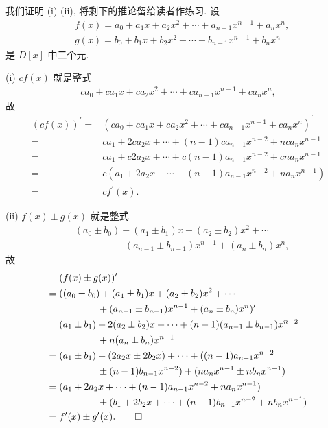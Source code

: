 \begin{pf}
    我们证明 (i) (ii), 将剩下的推论留给读者作练习. 设
    \begin{align*}
         & f(x) = a_0 + a_1 x + a_2 x^2 + \cdots + a_{n-1} x^{n-1} + a_n x^n, \\
         & g(x) = b_0 + b_1 x + b_2 x^2 + \cdots + b_{n-1} x^{n-1} + b_n x^n
    \end{align*}
    是 $D[x]$ 中二个元.

    (i) $cf(x)$ 就是整式
    \begin{align*}
        ca_0 + ca_1 x + ca_2 x^2 + \cdots + ca_{n-1} x^{n-1} + ca_n x^n,
    \end{align*}
    故
    \begin{align*}
        (cf(x))^{\prime}
        = {} & (ca_0 + ca_1 x + ca_2 x^2 + \cdots + ca_{n-1} x^{n-1} + ca_n x^n)^{\prime} \\
        = {} & ca_1 + 2ca_2 x + \cdots + (n-1)ca_{n-1} x^{n-2} + nca_n x^{n-1}            \\
        = {} & ca_1 + c2a_2 x + \cdots + c(n-1)a_{n-1} x^{n-2} + cna_n x^{n-1}            \\
        = {} & c(a_1 + 2a_2 x + \cdots + (n-1)a_{n-1} x^{n-2} + na_n x^{n-1})             \\
        = {} & cf^{\prime} (x).
    \end{align*}

    (ii) $f(x) \pm g(x)$ 就是整式
    \begin{align*}
         & (a_0 \pm b_0) + (a_1 \pm b_1) x + (a_2 \pm b_2) x^2 + \cdots       \\
         & \qquad \qquad + (a_{n-1} \pm b_{n-1}) x^{n-1} + (a_n \pm b_n) x^n,
    \end{align*}
    故
    \begin{align*}
             & (f(x) \pm g(x))^{\prime}                                                        \\
        = {} & ((a_0 \pm b_0) + (a_1 \pm b_1) x + (a_2 \pm b_2) x^2 + \cdots                   \\
             & \qquad \qquad + (a_{n-1} \pm b_{n-1}) x^{n-1} + (a_n \pm b_n) x^n)^{\prime}     \\
        = {} & (a_1 \pm b_1) + 2(a_2 \pm b_2) x + \cdots + (n-1) (a_{n-1} \pm b_{n-1}) x^{n-2} \\
             & \qquad \qquad + n (a_n \pm b_n) x^{n-1}                                         \\
        = {} & (a_1 \pm b_1) + (2a_2 x \pm 2b_2 x) + \cdots + ((n-1)a_{n-1} x^{n-2}            \\
             & \qquad \qquad \pm (n-1)b_{n-1} x^{n-2})
        + (na_n x^{n-1} \pm nb_n x^{n-1})                                                      \\
        = {} & (a_1 + 2a_2 x + \cdots + (n-1)a_{n-1} x^{n-2} + na_n x^{n-1})                   \\
             & \qquad \qquad \pm (b_1 + 2b_2 x + \cdots + (n-1)b_{n-1} x^{n-2} + nb_n x^{n-1}) \\
        = {} & f^{\prime} (x) \pm g^{\prime} (x). \qedhere
    \end{align*}
\end{pf}

